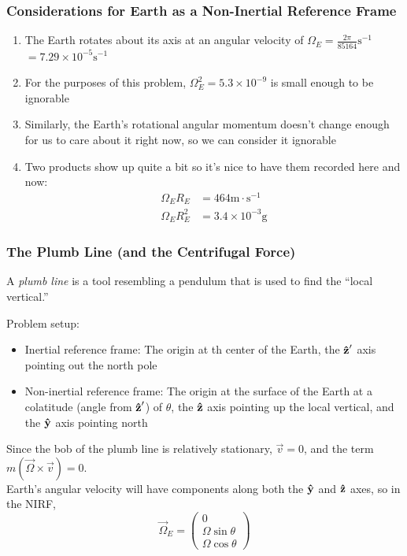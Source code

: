 \documentclass[a4paper]{article}
\begin{document}
\subsubsection{Considerations for Earth as a Non-Inertial Reference Frame}
\begin{enumerate}
	\item The Earth rotates about its axis at an angular velocity of
		$\Omega_E = \frac{2\pi}{85164}\mathrm{s^{-1}}$
		$= 7.29\times10^{-5} \mathrm{s^{-1}}$
	\item For the purposes of this problem, $\Omega_E^2 = 5.3\times10^{-9}$
		is small enough to be ignorable
	\item Similarly, the Earth's rotational angular momentum doesn't change
		enough for us to care about it right now, so we can consider
		it ignorable
	\item Two products show up quite a bit so it's nice to have them
		recorded here and now:
		\begin{align*}
			\Omega_E R_E &= 464 \mathrm{m\cdot s^{-1}}\\
			\Omega_E R_E^2 &= 3.4\times 10^{-3} \mathrm{g}
		\end{align*}
\end{enumerate}

\subsubsection{The Plumb Line (and the Centrifugal Force)}
\begin{defi}
	A \emph{plumb line} is a tool resembling a pendulum that is used to
	find the ``local vertical.''
\end{defi}
Problem setup:
\begin{itemize}
	\item Inertial reference frame: The origin at th center of the Earth,
		the $\boldsymbol{\mathbf{\hat{z}}}'$ axis pointing out the north pole
	\item Non-inertial reference frame: The origin at the surface of the
		Earth at a colatitude (angle from $\boldsymbol{\mathbf{\hat{z}}}'$) of $\theta$,
		the $\boldsymbol{\mathbf{\hat{z}}}$ axis pointing up the local vertical, and the
		$\boldsymbol{\mathbf{\hat{y}}}$ axis pointing north
\end{itemize}
Since the bob of the plumb line is relatively stationary, $\vec{v}=0$, and
the term $m(\vec{\Omega}\times\vec{v})=0$.\\
Earth's angular velocity will have components along both the $\boldsymbol{\mathbf{\hat{y}}}$ and $\boldsymbol{\mathbf{\hat{z}}}$
axes, so in the NIRF,
\[ \vec{\Omega}_E = \begin{pmatrix}0\\\Omega\sin\theta\\
	\Omega\cos\theta\end{pmatrix} \]
\end{document}
